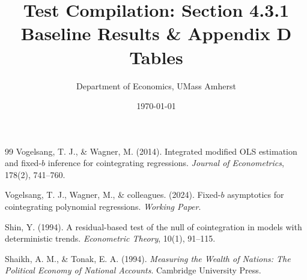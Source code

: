 \documentclass[11pt,a4paper]{article}
\title{\textbf{Test Compilation: Section 4.3.1 Baseline Results \& Appendix D Tables}}
\author{Department of Economics, UMass Amherst}
\date{\today}
\begin{document}
\maketitle



\newpage


\begin{thebibliography}{99}
Vogelsang, T. J., \& Wagner, M. (2014). Integrated modified OLS estimation and fixed-$b$ inference for cointegrating regressions. \textit{Journal of Econometrics}, 178(2), 741--760.

Vogelsang, T. J., Wagner, M., \& colleagues. (2024). Fixed-$b$ asymptotics for cointegrating polynomial regressions. \textit{Working Paper}.

Shin, Y. (1994). A residual-based test of the null of cointegration in models with deterministic trends. \textit{Econometric Theory}, 10(1), 91--115.

Shaikh, A. M., \& Tonak, E. A. (1994). \textit{Measuring the Wealth of Nations: The Political Economy of National Accounts}. Cambridge University Press.
\end{thebibliography}
\end{document}
